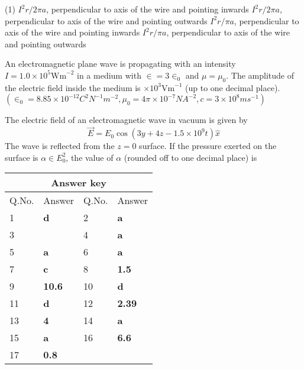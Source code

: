 \begin{enumerate}
\begin{minipage}{\textwidth}
\end{minipage}
\begin{tasks}(1)
	\task[\textbf{A.}] $I^{2} r / 2 \pi a$, perpendicular to axis of the wire and pointing inwards
	\task[\textbf{B.}]$I^{2} r / 2 \pi a$, perpendicular to axis of the wire and pointing outwards
	\task[\textbf{C.}]$I^{2} r / \pi a$, perpendicular to axis of the wire and pointing inwards
	\task[\textbf{D.}]$I^{2} r / \pi a$, perpendicular to axis of the wire and pointing outwards
\end{tasks}
\begin{minipage}{\textwidth}
	\item An electromagnetic plane wave is propagating with an intensity $I=1.0 \times 10^{5} \mathrm{Wm}^{-2}$ in a medium with $\in=3 \in_{0}$ and $\mu=\mu_{0}$. The amplitude of the electric field inside the medium is $\times 10^{3} \mathrm{Vm}^{-1}$ (up to one decimal place). $\left(\in_{0}=8.85 \times 10^{-12} C^{2} N^{-1} m^{-2}, \mu_{0}=4 \pi \times 10^{-7} N A^{-2}, c=3 \times 10^{8} m s^{-1}\right)$
\end{minipage}
\begin{minipage}{\textwidth}
	\item The electric field of an electromagnetic wave in vacuum is given by
	$$
	\vec{E}=E_{0} \cos \left(3 y+4 z-1.5 \times 10^{9} t\right) \hat{x}
	$$
	The wave is reflected from the $z=0$ surface. If the pressure exerted on the surface is $\alpha \in E_{0}^{2}$, the value of $\alpha$ (rounded off to one decimal place) is
\end{minipage}
 \end{enumerate}

\setlength\arrayrulewidth{1pt}
\begin{table}[H]
	\centering
	
	\begin{tabular}{|p{1.5cm}|p{1.5cm}||p{1.5cm}|p{1.5cm}|}
		\hline
		\multicolumn{4}{|c|}{\textbf{Answer key}}\\\hline\hline
		\rowcolor{ocrel}Q.No.&Answer&Q.No.&Answer\\\hline
		1&\textbf{d}&2&\textbf{a}\\\hline
		3&\textbf{}&4&\textbf{a}\\\hline
		5&\textbf{a}&6&\textbf{a}\\\hline
		7&\textbf{c}&8&\textbf{1.5}\\\hline
		9&\textbf{10.6}&10&\textbf{d}\\\hline
		11&\textbf{d}&12&\textbf{2.39}\\\hline
		13&\textbf{4}&14&\textbf{a}\\\hline
		15&\textbf{a}&16&\textbf{6.6}\\\hline
		17&\textbf{0.8}&&\\\hline
	\end{tabular}
\end{table}


   